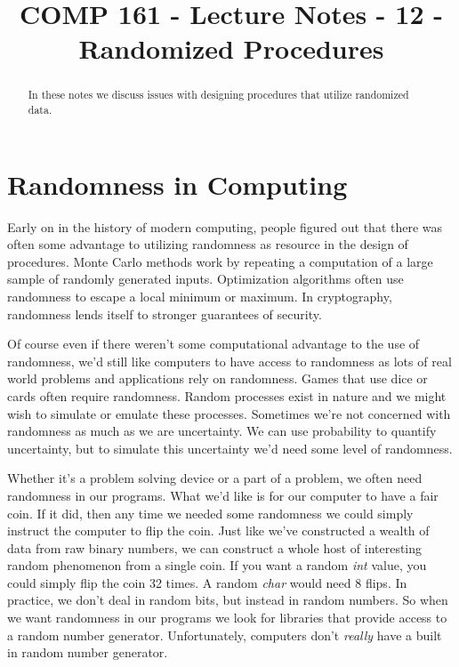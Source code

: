 \documentclass[]{tufte-handout}
\title{COMP 161 - Lecture Notes - 12 - Randomized Procedures}
\begin{document}
 
\maketitle

\begin{abstract}
In these notes we discuss issues with designing procedures that utilize randomized data.
\end{abstract}


\section{Randomness in Computing}

Early on in the history of modern computing, people figured out that there was often some advantage to utilizing randomness as resource in the design of procedures.  Monte Carlo methods work by repeating a computation of a large sample of randomly generated inputs. Optimization algorithms often use randomness to escape a local minimum or maximum.  In cryptography, randomness lends itself to stronger guarantees of security.  

Of course even if there weren't some computational advantage to the use of randomness, we'd still like computers to have access to randomness as lots of real world problems and applications rely on randomness. Games that use dice or cards often require randomness. Random processes exist in nature and we might wish to simulate or emulate these processes.  Sometimes we're not concerned with randomness as much as we are uncertainty. We can use probability to quantify uncertainty, but to simulate this uncertainty we'd need some level of randomness. 

Whether it's a problem solving device or a part of a problem, we often need randomness in our programs. What we'd like is for our computer to have a fair coin. If it did, then any time we needed some randomness we could simply instruct the computer to flip the coin.  Just like we've constructed a wealth of data from raw binary numbers, we can construct a whole host of interesting random phenomenon  from a single coin. If you want a random \textit{int} value, you could simply flip the coin 32 times. A random \textit{char} would need 8 flips.  In practice, we don't deal in random bits, but instead in random numbers.  So when we want randomness in our programs we look for libraries that provide access to a random number generator.  Unfortunately, computers don't \textit{really} have a built in random number generator.
\end{document}
